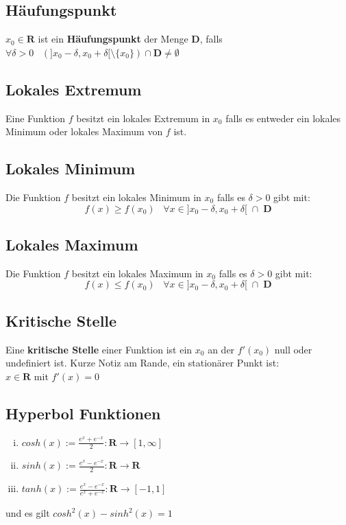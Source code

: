 \documentclass[8pt]{extarticle}
\def\R{\mathbf{R}}
\begin{document}
\begin{multicols*}{3}
\subsection{Häufungspunkt}

$x_0 \in \mathbf{R}$ ist ein \textbf{Häufungspunkt} der Menge $\mathbf{D}$,
falls $\forall \delta > 0 \;\;\; (]x_0 - \delta, x_0 + \delta[ \setminus \{x_0\}) \cap \mathbf{D} \neq \emptyset$

\subsection{Lokales Extremum}

Eine Funktion $f$ besitzt ein lokales Extremum in $x_0$ falls es entweder ein lokales Minimum oder lokales Maximum von $f$ ist.

\subsection{Lokales Minimum}

Die Funktion $f$ besitzt ein lokales Minimum in $x_0$ falls es $\delta > 0$ gibt mit:
$$f(x) \geq f(x_0) \;\;\; \forall x \in ]x_0 - \delta, x_0 + \delta[\; \cap \; \mathbf{D}$$

\subsection{Lokales Maximum}

Die Funktion $f$ besitzt ein lokales Maximum in $x_0$ falls es $\delta > 0$ gibt mit:
$$f(x) \leq f(x_0) \;\;\; \forall x \in ]x_0 - \delta, x_0 + \delta[\; \cap \; \mathbf{D}$$

\subsection{Kritische Stelle}

Eine \textbf{kritische Stelle} einer Funktion ist ein $x_0$ an der $f'(x_0)$ null
oder undefiniert ist.
Kurze Notiz am Rande, ein stationärer Punkt ist: \\
 $x \in \R$ mit $f'(x) = 0$

\subsection{Hyperbol Funktionen}

\begin{enumerate}[(i)]
  \item $cosh(x) := \frac{e^x + e^{-x}}{2}: \mathbf{R} \rightarrow [1, \infty]$
  \item $sinh(x) := \frac{e^x - e^{-x}}{2}: \mathbf{R} \rightarrow \mathbf{R}$
  \item $tanh(x) := \frac{e^x - e^{-x}}{e^x + e^{-x}}: \mathbf{R} \rightarrow [-1, 1]$
\end{enumerate}
und es gilt $cosh^2(x) - sinh^2(x) = 1$




\end{multicols*}
\end{document}
